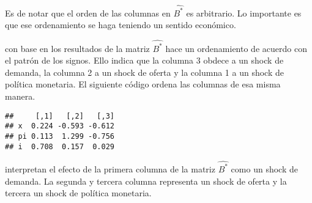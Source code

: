 \documentclass[
]{book}
\newenvironment{Shaded}{\begin{snugshade}}{\end{snugshade}}
\newcommand{\DecValTok}[1]{\textcolor[rgb]{0.00,0.00,0.81}{#1}}
\newcommand{\FunctionTok}[1]{\textcolor[rgb]{0.00,0.00,0.00}{#1}}
\newcommand{\NormalTok}[1]{#1}
\newcommand{\OtherTok}[1]{\textcolor[rgb]{0.56,0.35,0.01}{#1}}
\newcommand{\SpecialCharTok}[1]{\textcolor[rgb]{0.00,0.00,0.00}{#1}}
\begin{document}
Es de notar que el orden de las columnas en \(\hat{B^{*}}\) es arbitrario. Lo importante es que ese ordenamiento se haga teniendo un sentido económico.

\citet{Herwartz2016} con base en los resultados de la matriz \(\hat{B^{*}}\) hace un ordenamiento de acuerdo con el patrón de los signos. Ello indica que la columna 3 obdece a un shock de demanda, la columna 2 a un shock de oferta y la columna 1 a un shock de política monetaria. El siguiente código ordena las columnas de esa misma manera.

\begin{Shaded}
\end{Shaded}

\begin{verbatim}
##     [,1]   [,2]   [,3]
## x  0.224 -0.593 -0.612
## pi 0.113  1.299 -0.756
## i  0.708  0.157  0.029
\end{verbatim}

\citet{Herwartz2016} interpretan el efecto de la primera columna de la matriz \(\hat{B^{*}}\) como un shock de demanda. La segunda y tercera columna representa un shock de oferta y la tercera un shock de política monetaria.
\end{document}
